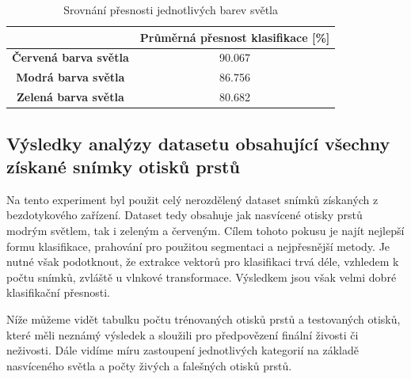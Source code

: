 \capstartfalse
\begin{table}[!htbp]
\centering
\begin{tabular}{|c|c|}
\hline
                              & \textbf{Průměrná přesnost klasifikace {[}\%{]}} \\ \hline
\textbf{Červená barva světla} & 90.067                                         \\ \hline
\textbf{Modrá barva světla}   & 86.756                                         \\ \hline
\textbf{Zelená barva světla}  & 80.682                                        \\ \hline
\end{tabular}
\caption{Srovnání přesnosti jednotlivých barev světla}
\end{table}
\capstarttrue

\subsection{Výsledky analýzy datasetu obsahující všechny získané snímky otisků prstů}
Na tento experiment byl použit celý nerozdělený dataset snímků získaných z bezdotykového zařízení. Dataset tedy obsahuje jak nasvícené otisky prstů modrým světlem, tak i zeleným a červeným. Cílem tohoto pokusu je najít nejlepší formu klasifikace, prahování pro použitou segmentaci a nejpřesnější metody. Je nutné však podotknout, že extrakce vektorů pro klasifikaci trvá déle, vzhledem k počtu snímků, zvláště u vlnkové transformace. Výsledkem jsou však velmi dobré klasifikační přesnosti. 

Níže můžeme vidět tabulku počtu trénovaných otisků prstů a testovaných otisků, které měli neznámý výsledek a sloužili pro předpovězení finální živosti či neživosti. Dále vidíme míru zastoupení jednotlivých kategorií na základě nasvíceného světla a počty živých a falešných otisků prstů.

